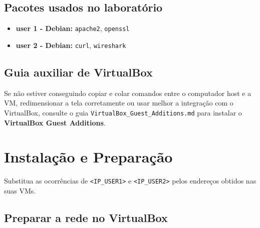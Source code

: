 \subsection{Pacotes usados no laboratório}

\begin{itemize}
  \item \textbf{user 1 - Debian:} \texttt{apache2}, \texttt{openssl}
  \item \textbf{user 2 - Debian:} \texttt{curl}, \texttt{wireshark}
\end{itemize}

\subsection{Guia auxiliar de VirtualBox}

\begin{notebox}
Se não estiver conseguindo copiar e colar comandos entre o computador host e a VM, redimensionar a tela corretamente ou usar melhor a integração com o VirtualBox, consulte o guia \texttt{VirtualBox\_Guest\_Additions.md} para instalar o \textbf{VirtualBox Guest Additions}.
\end{notebox}

\section{Instalação e Preparação}

\begin{notebox}
Substitua as ocorrências de \texttt{<IP\_USER1>} e \texttt{<IP\_USER2>} pelos endereços obtidos nas suas VMs.
\end{notebox}

\subsection{Preparar a rede no VirtualBox}

